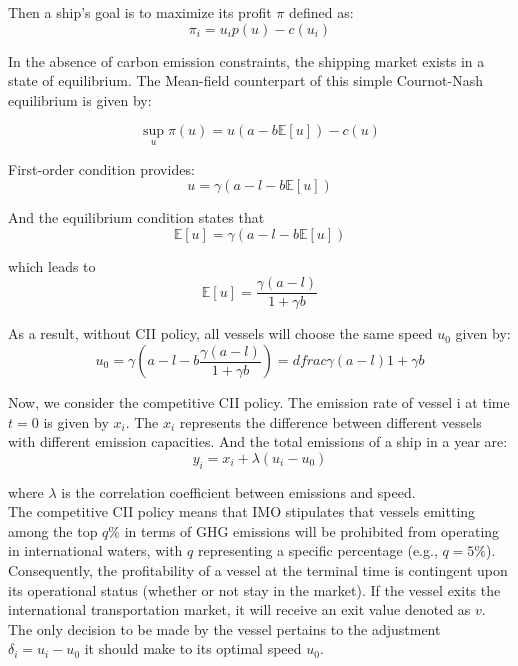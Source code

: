 \documentclass[a4paper,12pt]{article}
\begin{document}
Then a ship's goal is to maximize its profit $\pi$ defined as:
\begin{equation}
	\label{eq:profit}
	\pi_i=u_ip(u)-c(u_i)
\end{equation}

In the absence of carbon emission constraints, the shipping market exists in a state of equilibrium. The Mean-field counterpart of this simple Cournot-Nash equilibrium is given by:

\begin{equation}
	\label{eq:Cournot-Nash}
	\operatorname*{sup}_{u} \pi(u) = u(a-b\mathbb{E}[u])-c(u)
\end{equation}

First-order condition provides:
\begin{equation}
	\label{eq:equilibrium1}
	u = \gamma(a-l-b\mathbb{E}[u])
\end{equation}

And the equilibrium condition states that
\begin{equation}
	\label{eq:condition1}
	\mathbb{E}[u]= \gamma (a-l-b\mathbb{E}[u])
\end{equation}

which leads to
\begin{equation}
	\mathbb{E}[u] = \dfrac{\gamma (a-l)}{1+\gamma b}
\end{equation}

As a result, without CII policy, all vessels will choose the same speed $u_0$ given by:
\begin{equation}
	\label{eq:u0}
	u_0 = \gamma \left(a-l-b \dfrac{\gamma (a-l)}{1+\gamma b}\right)=dfrac{\gamma (a-l)}{1+\gamma b}
\end{equation}

Now, we consider the competitive CII policy. The emission rate of vessel i at time $t=0$ is given by $x_i$.
The $x_i$ represents the difference between different vessels with different emission capacities. And the total emissions of a ship in a year are:
\begin{equation}
	\label{eq:y}
	y_i = x_i + \lambda(u_i-u_0)
\end{equation}

where $\lambda$ is the correlation coefficient between emissions and speed.\\

The competitive CII policy means that IMO stipulates that vessels emitting among the top $q\%$ in terms of GHG emissions will be prohibited from operating in international waters, with $q$ representing a specific percentage (e.g., $q = 5\%$).
Consequently, the profitability of a vessel at the terminal time is contingent upon its operational status (whether or not stay in the market).
If the vessel exits the international transportation market, it will receive an exit value denoted as $v$.
The only decision to be made by the vessel pertains to the adjustment $\delta_i=u_i-u_0$ it should make to its optimal speed $u_0$.\\
\end{document}
